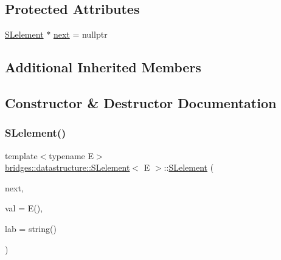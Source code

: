 \subsection*{Protected Attributes}
\begin{DoxyCompactItemize}
\item 
\mbox{\hyperlink{classbridges_1_1datastructure_1_1_s_lelement}{S\+Lelement}} $\ast$ \mbox{\hyperlink{classbridges_1_1datastructure_1_1_s_lelement_afc016a593a4a5aba82021ee34edadbfc}{next}} = nullptr
\end{DoxyCompactItemize}
\subsection*{Additional Inherited Members}


\subsection{Constructor \& Destructor Documentation}
\mbox{\label{classbridges_1_1datastructure_1_1_s_lelement_ac69e99f5b2b729a217160ee0517751aa}} 
\subsubsection{\texorpdfstring{SLelement()}{SLelement()}\hspace{0.1cm}{\footnotesize\ttfamily [1/2]}}
{\footnotesize\ttfamily template$<$typename E$>$ \\
\mbox{\hyperlink{classbridges_1_1datastructure_1_1_s_lelement}{bridges\+::datastructure\+::\+S\+Lelement}}$<$ E $>$\+::\mbox{\hyperlink{classbridges_1_1datastructure_1_1_s_lelement}{S\+Lelement}} (\begin{DoxyParamCaption}\item[{\mbox{\hyperlink{classbridges_1_1datastructure_1_1_s_lelement}{S\+Lelement}}$<$ E $>$ $\ast$}]{next,  }\item[{const E \&}]{val = {\ttfamily E()},  }\item[{const string \&}]{lab = {\ttfamily string()} }\end{DoxyParamCaption})\hspace{0.3cm}{\ttfamily [inline]}}

